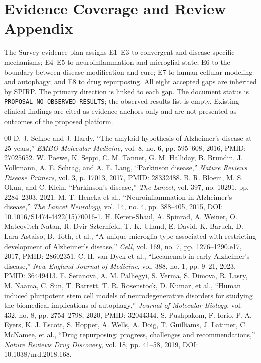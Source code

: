 \documentclass[conference]{IEEEtran}
\begin{document}
\section{Evidence Coverage and Review Appendix}
The Survey evidence plan assigns E1--E3 to convergent and disease-specific mechanisms; E4--E5 to neuroinflammation and microglial state; E6 to the boundary between disease modification and cure; E7 to human cellular modeling and autophagy; and E8 to drug repurposing. All eight accepted gaps are inherited by SPIRP. The primary direction is linked to each gap. The document status is \texttt{PROPOSAL\_NO\_OBSERVED\_RESULTS}; the observed-results list is empty. Existing clinical findings are cited as evidence anchors only and are not presented as outcomes of the proposed platform.

\balance
\begin{thebibliography}{00}
 D. J. Selkoe and J. Hardy, ``The amyloid hypothesis of Alzheimer's disease at 25 years,'' \emph{EMBO Molecular Medicine}, vol. 8, no. 6, pp. 595--608, 2016, PMID: 27025652.
 W. Poewe, K. Seppi, C. M. Tanner, G. M. Halliday, B. Brundin, J. Volkmann, A. E. Schrag, and A. E. Lang, ``Parkinson disease,'' \emph{Nature Reviews Disease Primers}, vol. 3, p. 17013, 2017, PMID: 28332488.
 B. R. Bloem, M. S. Okun, and C. Klein, ``Parkinson's disease,'' \emph{The Lancet}, vol. 397, no. 10291, pp. 2284--2303, 2021.
 M. T. Heneka et al., ``Neuroinflammation in Alzheimer's disease,'' \emph{The Lancet Neurology}, vol. 14, no. 4, pp. 388--405, 2015, DOI: 10.1016/S1474-4422(15)70016-1.
 H. Keren-Shaul, A. Spinrad, A. Weiner, O. Matcovitch-Natan, R. Dvir-Szternfeld, T. K. Ulland, E. David, K. Baruch, D. Lara-Astaiso, B. Toth, et al., ``A unique microglia type associated with restricting development of Alzheimer’s disease,'' \emph{Cell}, vol. 169, no. 7, pp. 1276--1290.e17, 2017, PMID: 28602351.
 C. H. van Dyck et al., ``Lecanemab in early Alzheimer's disease,'' \emph{New England Journal of Medicine}, vol. 388, no. 1, pp. 9--21, 2023, PMID: 36449413.
 E. Seranova, A. M. Palhegyi, S. Verma, S. Dimova, R. Lasry, M. Naama, C. Sun, T. Barrett, T. R. Rosenstock, D. Kumar, et al., ``Human induced pluripotent stem cell models of neurodegenerative disorders for studying the biomedical implications of autophagy,'' \emph{Journal of Molecular Biology}, vol. 432, no. 8, pp. 2754--2798, 2020, PMID: 32044344.
 S. Pushpakom, F. Iorio, P. A. Eyers, K. J. Escott, S. Hopper, A. Wells, A. Doig, T. Guilliams, J. Latimer, C. McNamee, et al., ``Drug repurposing: progress, challenges and recommendations,'' \emph{Nature Reviews Drug Discovery}, vol. 18, pp. 41--58, 2019, DOI: 10.1038/nrd.2018.168.
\end{thebibliography}
\end{document}
